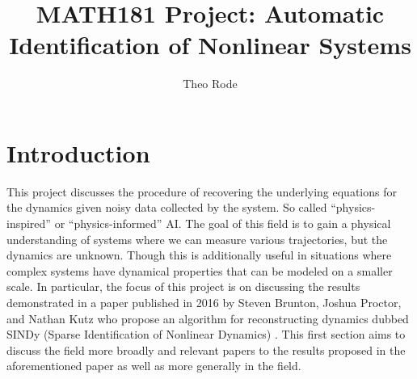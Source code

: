 \documentclass[10pt]{paper}
\begin{document}
\title{MATH181 Project: Automatic Identification of Nonlinear Systems}
\author{Theo Rode}



\maketitle

\section{Introduction}
\label{sec:introduction}
This project discusses the procedure of recovering the underlying equations for the dynamics given noisy data collected by the system. So called ``physics-inspired'' or ``physics-informed'' AI.
The goal of this field is to gain a physical understanding of systems where we can measure various trajectories, but the dynamics are unknown. Though this is additionally useful in situations where complex systems have dynamical properties that can be modeled on a smaller scale. 
In particular, the focus of this project is on discussing the results demonstrated in a paper published in 2016 by Steven Brunton, Joshua Proctor, and Nathan Kutz who propose an algorithm for reconstructing dynamics dubbed SINDy (Sparse Identification of Nonlinear Dynamics) \cite{sindy}.
This first section aims to discuss the field more broadly and relevant papers to the results proposed in the aforementioned paper as well as more generally in the field. 
\end{document}

